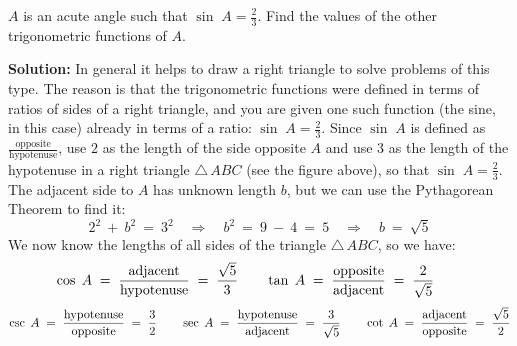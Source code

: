\begin{exmp}\label{exmp:ex1.8}
\noindent $A$ is an acute angle such that $\sin\;A = \frac{2}{3}$. Find the values of the other trigonometric
 functions of $A$.\vspace{1mm}
 \par\noindent\textbf{Solution:} In general it helps to draw a right triangle to solve problems of
 this type. The reason is that the trigonometric functions were defined in terms of ratios of
 sides of a right triangle, and you are given one such function (the sine, in this case)
 already in terms of a ratio: $\sin\;A = \frac{2}{3}$. Since $\sin\;A$ is defined as
 $\frac{\text{opposite}}{\text{hypotenuse}}$, use $2$ as the length of the side opposite $A$ and use
 $3$ as the length of the hypotenuse in a right triangle $\triangle\,ABC$ (see the figure above), so
 that $\sin\;A = \frac{2}{3}$.
 The adjacent side to $A$ has unknown length $b$, but we can use the Pythagorean Theorem to find it:
 \begin{displaymath}
  2^2 ~+~ b^2 ~=~ 3^2 \quad\Rightarrow\quad b^2 ~=~ 9 ~-~ 4 ~=~ 5 \quad\Rightarrow\quad
   b ~=~ \sqrt{5}
 \end{displaymath}
 We now know the lengths of all sides of the triangle $\triangle\,ABC$, so we have:
 \begin{displaymath}
  \cos\;A \;=\; \dfrac{\text{adjacent}}{\text{hypotenuse}} \;=\; \dfrac{\sqrt{5}}{3} \qquad
  \tan\;A \;=\; \dfrac{\text{opposite}}{\text{adjacent}} \;=\;
   \dfrac{2}{\sqrt{5}}\quad\quad\vspace{2mm}
 \end{displaymath}
 \begin{displaymath}
  \csc\;A \;=\; \dfrac{\text{hypotenuse}}{\text{opposite}} \;=\; \dfrac{3}{2} \qquad
  \sec\;A \;=\; \dfrac{\text{hypotenuse}}{\text{adjacent}} \;=\; \dfrac{3}{\sqrt{5}} \qquad
  \cot\;A \;=\; \dfrac{\text{adjacent}}{\text{opposite}} \;=\; \dfrac{\sqrt{5}}{2}\vspace{2mm}
 \end{displaymath}
\end{exmp}\vspace{-2mm}
\divider
\vspace{2mm}

